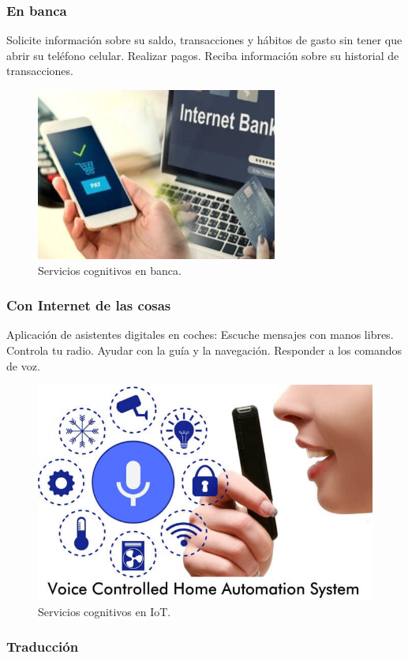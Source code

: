 \subsubsection{En banca}

Solicite información sobre su saldo, transacciones y hábitos de gasto sin tener que abrir su teléfono celular.
Realizar pagos.
Reciba información sobre su historial de transacciones.

\begin{figure}[htbp]
\centerline{\includegraphics[width = 0.5 \textwidth]{fig42.jpg}}
\caption{Servicios cognitivos en banca.}
\label{fig42}
\end{figure}

\subsubsection{Con Internet de las cosas}

Aplicación de asistentes digitales en coches: 
Escuche mensajes con manos libres.
Controla tu radio.
Ayudar con la guía y la navegación.
Responder a los comandos de voz.

\begin{figure}[htbp]
\centerline{\includegraphics[width = 0.5 \textwidth]{fig33.jpg}}
\caption{Servicios cognitivos en IoT.}
\label{fig33}
\end{figure}

\subsubsection{Traducción}

